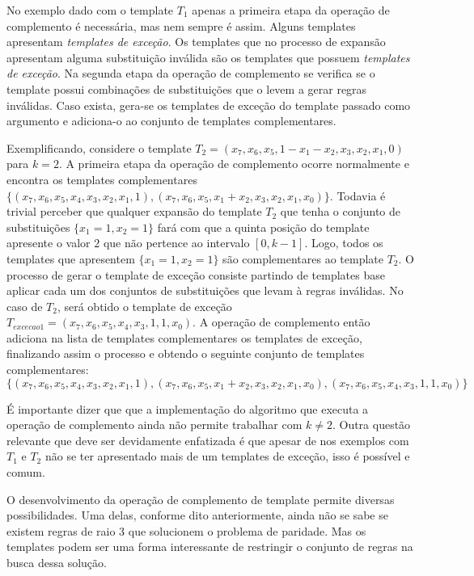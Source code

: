 \documentclass[12pt,a4paper]{article}
\begin{document}
	No exemplo dado com o template $T_1$ apenas a primeira etapa da operação de complemento é necessária, mas nem sempre é assim. Alguns templates apresentam \textit{templates de exceção}. Os templates que no processo de expansão apresentam alguma substituição inválida são os templates que possuem \textit{templates de exceção}. Na segunda etapa da operação de complemento se verifica se o template possui combinações de substituições que o levem a gerar regras inválidas. Caso exista, gera-se os templates de exceção do template passado como argumento e adiciona-o ao conjunto de templates complementares.

	Exemplificando, considere o template $T_2 = (x_7, x_6, x_5, 1 - x_1 - x_2, x_3, x_2, x_1, 0)$ para $k=2$. A primeira etapa da operação de complemento ocorre normalmente e encontra os templates complementares $\{(x_7, x_6, x_5, x_4, x_3, x_2, x_1, 1),(x_7, x_6, x_5, x_1 + x_2, x_3, x_2, x_1, x_0)\}$. Todavia é trivial perceber que qualquer expansão do template $T_2$ que tenha o conjunto de substituições $\{x_1 = 1, x_2 = 1\}$ fará com que a quinta posição do template apresente o valor $2$ que não pertence ao intervalo $[0,k-1]$. Logo, todos os templates que apresentem $\{x_1 = 1, x_2 = 1\}$ são complementares ao template $T_2$. O processo de gerar o template de exceção consiste partindo de templates base aplicar cada um dos conjuntos de substituições que levam à regras inválidas. No caso de $T_2$, será obtido o template de exceção $T_{excecao 1} = (x_7, x_6, x_5, x_4, x_3, 1, 1, x_0)$. A operação de complemento então adiciona na lista de templates complementares os templates de exceção, finalizando assim o processo e obtendo o seguinte conjunto de templates complementares:
	\begin{equation}
	\{(x_7, x_6, x_5, x_4, x_3, x_2, x_1, 1),(x_7, x_6, x_5, x_1 + x_2, x_3, x_2, x_1, x_0),(x_7, x_6, x_5, x_4, x_3, 1, 1, x_0)\}
	\label{eq:complementionSet}
	\end{equation}

	É importante dizer que que a implementação do algoritmo que executa a operação de complemento ainda não permite trabalhar com $k\neq 2$. Outra questão relevante que deve ser devidamente enfatizada é que apesar de nos exemplos com $T_1$ e $T_2$ não se ter apresentado mais de um templates de exceção, isso é possível e comum.

	O desenvolvimento da operação de complemento de template permite diversas possibilidades. Uma delas, conforme dito anteriormente, ainda não se sabe se existem regras de raio 3 que solucionem o problema de paridade. Mas os templates podem ser uma forma interessante de restringir o conjunto de regras na busca dessa solução.
\end{document}
